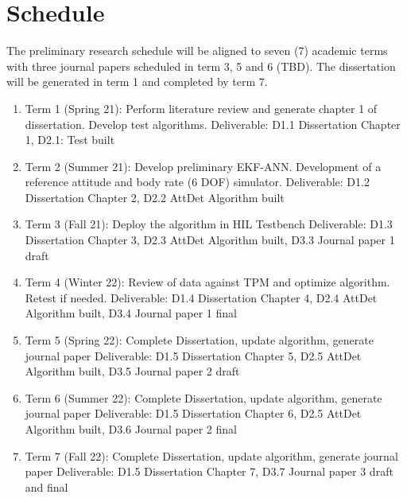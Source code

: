 \section{Schedule}\label{CHAP1_6}
The preliminary research schedule will be aligned to seven (7) academic terms with three journal papers scheduled in term 3, 5 and 6 (TBD). The dissertation will be generated in term 1 and completed by term 7.
\begin{enumerate}
    \item Term 1 (Spring 21):  Perform literature review and generate chapter 1 of dissertation. Develop test algorithms.
    Deliverable: D1.1 Dissertation Chapter 1, D2.1: Test built

    \item Term 2 (Summer 21):  Develop preliminary EKF-ANN. Development of a reference attitude and body rate (6 DOF) simulator.  
    Deliverable: D1.2 Dissertation Chapter 2, D2.2 AttDet Algorithm built 

    \item Term 3 (Fall 21): Deploy the algorithm in HIL Testbench
    Deliverable: D1.3 Dissertation Chapter 3, D2.3 AttDet Algorithm built, D3.3 Journal paper 1 draft

    \item Term 4 (Winter 22): Review of data against TPM and optimize algorithm. Retest if needed. 
    Deliverable: D1.4 Dissertation Chapter 4, D2.4 AttDet Algorithm built, D3.4 Journal paper 1 final

    \item Term 5 (Spring 22): Complete Dissertation, update algorithm, generate journal paper 
    Deliverable: D1.5 Dissertation Chapter 5, D2.5 AttDet Algorithm built, D3.5 Journal paper 2 draft

    \item Term 6 (Summer 22): Complete Dissertation, update algorithm, generate journal paper
    Deliverable: D1.5 Dissertation Chapter 6, D2.5 AttDet Algorithm built, D3.6 Journal paper 2 final

    \item Term 7 (Fall 22): Complete Dissertation, update algorithm, generate journal paper
    Deliverable: D1.5 Dissertation Chapter 7, D3.7 Journal paper 3 draft and final

\end{enumerate}


